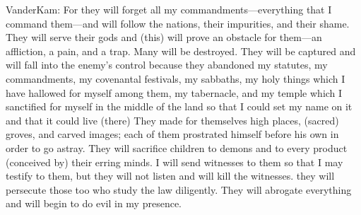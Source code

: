 \begin{ethiopictext}
\end{ethiopictext}
\begin{transliteration}
\end{transliteration}
\begin{translation}
    VanderKam: For they will forget all my commandments---everything that I command them---and will follow the nations, their impurities, and their shame. They will serve their gods and (this) will prove an obstacle for them---an affliction, a pain, and a trap.
    Many will be destroyed. They will be captured and will fall into the enemy's control because they abandoned my statutes, my commandments, my covenantal festivals, my sabbaths, my holy things which I have hallowed for myself among them, my tabernacle, and my temple which I sanctified for myself in the middle of the land so that I could set my name on it and that it could live (there)
    They  made for themselves high places, (sacred) groves, and carved images; each of them prostrated himself before his own in  order to go astray. They will sacrifice children to demons and to every product (conceived by) their erring minds.
    I will send witnesses to them so that I may testify to them, but they will not listen and will kill the witnesses. they will persecute those too who study the law diligently. They will abrogate everything and will begin to do evil in my presence.
\end{translation}